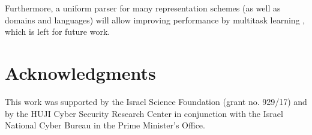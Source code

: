 \documentclass[11pt,a4paper]{article}
\begin{document}
Furthermore, a uniform parser for many representation schemes (as well as domains and languages)
will allow improving performance by multitask learning \cite{hershcovich2018multitask},
which is left for future work.


\section*{Acknowledgments}

This work was supported by the Israel Science Foundation (grant no. 929/17) and
by the HUJI Cyber Security Research Center
in conjunction with the Israel National Cyber Bureau in the Prime Minister's Office.





\end{document}
